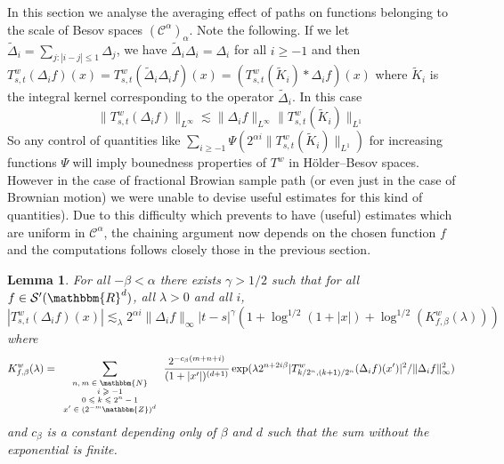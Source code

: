 \documentclass[a4paper,11pt]{article}
\newcommand{\tmscript}[1]{\text{\scriptsize{$#1$}}}
\newtheorem{lemma}[theorem]{Lemma}
\newcommand{\CC}{\mathscr C}
\begin{document}
In this section we analyse the averaging effect of paths on functions
belonging to the scale of Besov spaces $( \CC^{\alpha} )_{\alpha}$. Note the following. If we let $\tilde \Delta_i = \sum_{j:|i-j|\le 1} \Delta_j$, we have $\tilde \Delta_i \Delta _i = \Delta _i$ for all  $i\ge -1$  and then
$
T^{w}_{s,t} ( \Delta_{i} f ) ( x ) =T^{w}_{s,t} ( \tilde \Delta_{i} \Delta_{i} f ) ( x ) =(T^{w}_{s,t} ( \tilde K_{i}  ) * \Delta_{i} f) ( x )
$
where $\tilde K_i$ is the integral kernel corresponding to the operator $\tilde \Delta_{i}$. In this case
$$
\|T^{w}_{s,t} ( \Delta_{i} f )\|_{L^\infty} \lesssim \| \Delta_{i} f \|_{L^\infty}  \|T^{w}_{s,t} ( \tilde K_{i} )\|_{L^1} 
$$
So any control of quantities like
$
\sum_{i \ge -1} \Psi(2^{\alpha i} \|T^{w}_{s,t} ( \tilde K_{i} )\|_{L^1})
$
for increasing functions $\Psi$ will imply bounedness properties of $T^w$ in H\"older--Besov spaces. However in the case of fractional Browian sample path (or even just in the case of Brownian motion) we were unable to devise useful estimates for this kind of quantities).
Due to this difficulty which prevents to have (useful) estimates which are uniform in $\CC^{\alpha}$,  the chaining argument now depends on the chosen function $f$ and the computations follows closely those in the previous section.

\begin{lemma}
  \label{lemma:chaining_besov}For all $- \beta < \alpha$ there exists $\gamma
  >1/2$ such that for all $f \in \mathcal{S}' ( \mathbbm{R}^{d} )$, all
  $\lambda >0$ and all $i$,
  \[ | T^{w}_{s,t} ( \Delta_{i} f ) ( x ) | \lesssim_{\lambda} 2^{\alpha i}
     \| \Delta_{i} f \|_{\infty} | t-s |^{\gamma} ( 1+ \log^{1/2} ( 1+ | x | )
     + \log^{1/2} ( K^{w}_{f, \beta} ( \lambda ) ) ) \]
  where
  \[ K_{f, \beta}^{w} ( \lambda ) = \sum_{\tmscript{\begin{array}{c}
       n,m \in \mathbbm{N}\\
       i \geqslant -1\\
       0 \leqslant k \leqslant 2^{n} -1\\
       x' \in ( 2^{-m} \mathbbm{Z} )^{d}
     \end{array}}} \frac{2^{-c_{\beta} ( m+n+i )}} {( 1+ | x' | )^{( d+1 )}} \exp (
     \lambda 2^{n+2i \beta} | T^{w}_{k/2^{n} , ( k+1 ) /2^{n}} ( \Delta_{i} f
     ) ( x' ) |^{2} / \| \Delta_{i} f \|_{\infty}^{2} ) \]
  and $c_{\beta}$ is a constant depending only of $\beta$ and $d$ such that
  the sum without the exponential is finite.
\end{lemma}
\end{document}
